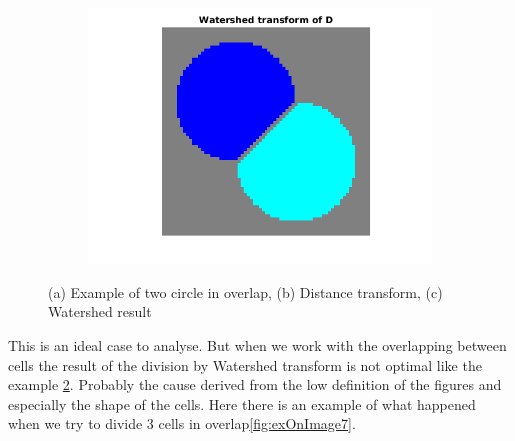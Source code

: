\begin{figure}[htbp]
\begin{subfigure}[b]{0.5\textwidth}
        \includegraphics[width=\textwidth]{img/watershedEx.png}
        \caption{ }
        \label{fig:overlapwater}
    \end{subfigure}
    \caption{(a) Example of two circle in overlap, (b) Distance transform, (c) Watershed result}\label{fig:stepswater}
\end{figure}
This is an ideal case to analyse. But when we work with the overlapping between cells the result of the division by Watershed transform is not optimal like the example \ref{fig:stepswater}. Probably the cause derived from the low definition of the figures and especially the shape of the cells. Here there is an example of what happened when we try to divide 3 cells in overlap\ref{fig:exOnImage7}.
